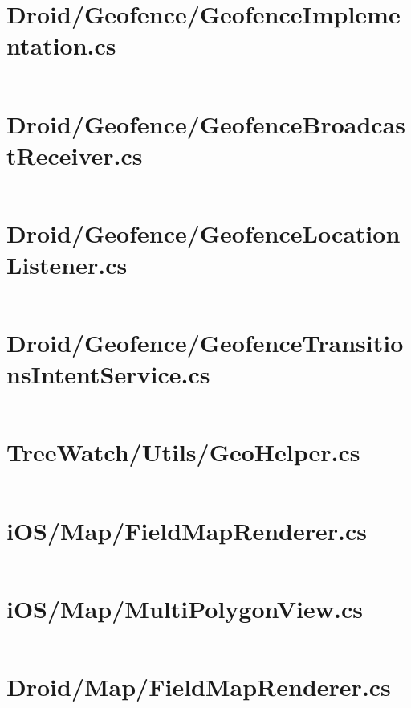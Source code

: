 \documentclass[12pt]{article}
\begin{document}
\pagebreak\section{Droid/Geofence/GeofenceImplementation.cs}
\inputminted[linenos,firstline=184]{csharp}{../../../src/Droid/Geofence/GeofenceImplementation.cs}

\pagebreak\section{Droid/Geofence/GeofenceBroadcastReceiver.cs}
\inputminted[linenos,firstline=22]{csharp}{../../../src/Droid/Geofence/GeofenceBroadcastReceiver.cs}

\pagebreak\section{Droid/Geofence/GeofenceLocationListener.cs}
\inputminted[linenos,firstline=22]{csharp}{../../../src/Droid/Geofence/GeofenceLocationListener.cs}

\pagebreak\section{Droid/Geofence/GeofenceTransitionsIntentService.cs}
\inputminted[linenos,firstline=22]{csharp}{../../../src/Droid/Geofence/GeofenceTransitionsIntentService.cs}

\pagebreak\section{TreeWatch/Utils/GeoHelper.cs}
\inputminted[linenos,firstline=22]{csharp}{../../../src/TreeWatch/Utils/GeoHelper.cs}

\pagebreak\section{iOS/Map/FieldMapRenderer.cs}
\inputminted[linenos,firstline=22]{csharp}{../../../src/iOS/Map/FieldMapRenderer.cs}

\pagebreak\section{iOS/Map/MultiPolygonView.cs}
\inputminted[linenos,firstline=22]{csharp}{../../../src/iOS/Map/MultiPolygonView.cs}

\pagebreak\section{Droid/Map/FieldMapRenderer.cs}
\inputminted[linenos,firstline=22]{csharp}{../../../src/Droid/Map/FieldMapRenderer.cs}
\end{document}

